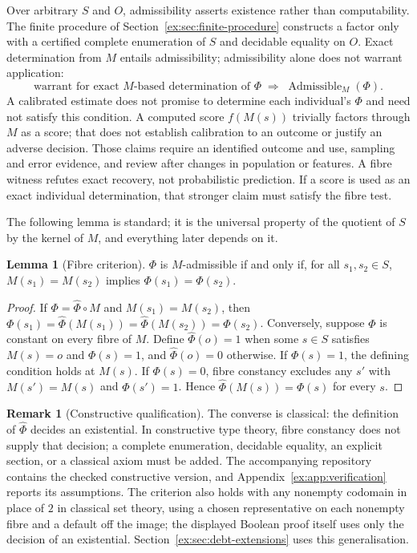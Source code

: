 \documentclass[11pt]{article}
\theoremstyle{definition}
\newtheorem{lemma}[proposition]{Lemma}
\newtheorem{remark}{Remark}[section]
\begin{document}
Over arbitrary $S$ and $O$, admissibility asserts existence rather than computability. The finite procedure of Section~\ref{ex:sec:finite-procedure} constructs a factor only with a certified complete enumeration of $S$ and decidable equality on $O$. Exact determination from $M$ entails admissibility; admissibility alone does not warrant application:
\[
\text{warrant for exact $M$-based determination of $\Phi$} \;\Longrightarrow\; \operatorname{Admissible}_M(\Phi).
\]
A calibrated estimate does not promise to determine each individual's $\Phi$ and need not satisfy this condition. A computed score $f(M(s))$ trivially factors through $M$ as a score; that does not establish calibration to an outcome or justify an adverse decision. Those claims require an identified outcome and use, sampling and error evidence, and review after changes in population or features. A fibre witness refutes exact recovery, not probabilistic prediction. If a score is used as an exact individual determination, that stronger claim must satisfy the fibre test.

The following lemma is standard; it is the universal property of the quotient of $S$ by the kernel of $M$, and everything later depends on it.

\begin{lemma}[Fibre criterion]\label{ex:prop:fibre}
$\Phi$ is $M$-admissible if and only if, for all $s_1,s_2 \in S$, $M(s_1)=M(s_2)$ implies $\Phi(s_1)=\Phi(s_2)$.
\end{lemma}

\begin{proof}
If $\Phi=\widehat\Phi \circ M$ and $M(s_1)=M(s_2)$, then $\Phi(s_1)=\widehat\Phi(M(s_1))=\widehat\Phi(M(s_2))=\Phi(s_2)$. Conversely, suppose $\Phi$ is constant on every fibre of $M$. Define $\widehat\Phi(o)=1$ when some $s \in S$ satisfies $M(s)=o$ and $\Phi(s)=1$, and $\widehat\Phi(o)=0$ otherwise. If $\Phi(s)=1$, the defining condition holds at $M(s)$. If $\Phi(s)=0$, fibre constancy excludes any $s'$ with $M(s')=M(s)$ and $\Phi(s')=1$. Hence $\widehat\Phi(M(s))=\Phi(s)$ for every $s$.
\end{proof}

\begin{remark}[Constructive qualification]
The converse is classical: the definition of $\widehat\Phi$ decides an existential. In constructive type theory, fibre constancy does not supply that decision; a complete enumeration, decidable equality, an explicit section, or a classical axiom must be added. The accompanying repository contains the checked constructive version, and Appendix~\ref{ex:app:verification} reports its assumptions. The criterion also holds with any nonempty codomain in place of $2$ in classical set theory, using a chosen representative on each nonempty fibre and a default off the image; the displayed Boolean proof itself uses only the decision of an existential. Section~\ref{ex:sec:debt-extensions} uses this generalisation.
\end{remark}
\end{document}
